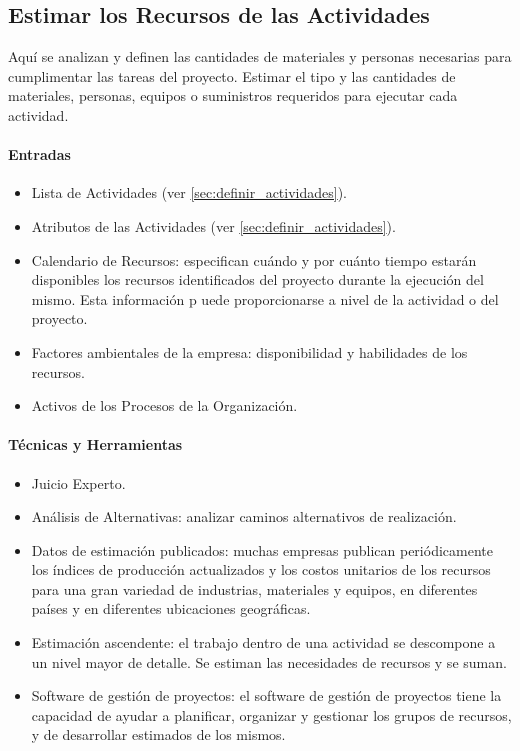 \documentclass[a4paper,twosides]{article}
\newlength{\wideitemsep}
\let\olditem\item
\renewcommand{\item}{\setlength{\itemsep}{\wideitemsep}\olditem}
\begin{document}
\subsection{Estimar los Recursos de las Actividades} \label{sec:estimar_recursos_actividades}
Aquí se analizan y definen las cantidades de materiales y personas necesarias para cumplimentar las tareas del proyecto. Estimar el tipo y las cantidades de materiales, personas, equipos o suministros requeridos para ejecutar cada actividad.

\paragraph{Entradas}
\begin{itemize}
\item Lista de Actividades (ver \ref{sec:definir_actividades}).
\item Atributos de las Actividades (ver \ref{sec:definir_actividades}).
\item Calendario de Recursos: especifican cuándo y por cuánto tiempo estarán disponibles los recursos identificados del proyecto durante la ejecución del mismo. Esta información p uede proporcionarse a nivel de la actividad o del proyecto.
\item Factores ambientales de la empresa: disponibilidad y habilidades de los recursos.
\item Activos de los Procesos de la Organización.
\end{itemize}

\paragraph{Técnicas y Herramientas}
\begin{itemize}
\item Juicio Experto.
\item Análisis de Alternativas: analizar caminos alternativos de realización.
\item Datos de estimación publicados: muchas empresas publican periódicamente los índices de producción actualizados y los costos unitarios de los recursos para una gran variedad de industrias, materiales y equipos, en diferentes países y en diferentes ubicaciones geográficas.
\item Estimación ascendente: el trabajo dentro de una actividad se descompone a un nivel mayor de detalle. Se estiman las necesidades de recursos y se suman.
\item Software de gestión de proyectos: el software de gestión de proyectos tiene la capacidad de ayudar a planificar, organizar y gestionar los grupos de recursos, y de desarrollar estimados de los mismos.
\end{itemize}
\end{document}
